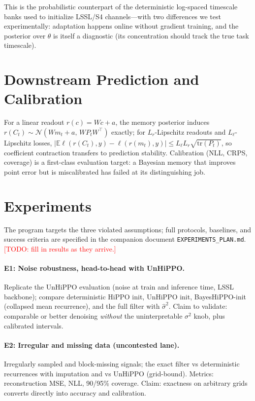 \documentclass[11pt]{article}
\newcommand{\E}{\mathbb{E}}
\newcommand{\N}{\mathcal{N}}
\newcommand{\TODO}[1]{\textcolor{red}{[TODO: #1]}}
\begin{document}
This is the probabilistic counterpart of the deterministic log-spaced timescale banks used to initialize LSSL/S4 channels---with two differences we test experimentally: adaptation happens online without gradient training, and the posterior over $\theta$ is itself a diagnostic (its concentration should track the true task timescale).

\section{Downstream Prediction and Calibration}

For a linear readout $r(c)=Wc+a$, the memory posterior induces $r(C_t)\sim\N(Wm_t+a,\,WP_tW^\top)$ exactly; for $L_r$-Lipschitz readouts and $L_\ell$-Lipschitz losses, $|\E\ell(r(C_t),y)-\ell(r(m_t),y)|\le L_\ell L_r\sqrt{\mathrm{tr}(P_t)}$, so coefficient contraction transfers to prediction stability. Calibration (NLL, CRPS, coverage) is a first-class evaluation target: a Bayesian memory that improves point error but is miscalibrated has failed at its distinguishing job.

\section{Experiments}\label{sec:experiments}

The program targets the three violated assumptions; full protocols, baselines, and success criteria are specified in the companion document \texttt{EXPERIMENTS\_PLAN.md}. \TODO{fill in results as they arrive.}

\paragraph{E1: Noise robustness, head-to-head with UnHiPPO.} Replicate the UnHiPPO evaluation (noise at train and inference time, LSSL backbone); compare deterministic HiPPO init, UnHiPPO init, BayesHiPPO-init (collapsed mean recurrence), and the full filter with $\widehat\sigma^2$. Claim to validate: comparable or better denoising \emph{without} the uninterpretable $\sigma^2$ knob, plus calibrated intervals.

\paragraph{E2: Irregular and missing data (uncontested lane).} Irregularly sampled and block-missing signals; the exact filter vs deterministic recurrences with imputation and vs UnHiPPO (grid-bound). Metrics: reconstruction MSE, NLL, 90/95\% coverage. Claim: exactness on arbitrary grids converts directly into accuracy and calibration.
\end{document}
